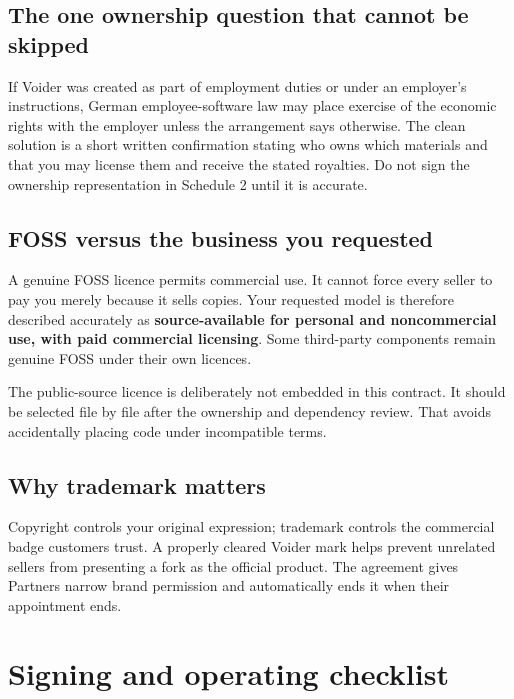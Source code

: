 \documentclass[11pt,a4paper]{article}
\begin{document}
\subsection*{The one ownership question that cannot be skipped}

If Voider was created as part of employment duties or under an employer's instructions, German employee-software law may place exercise of the economic rights with the employer unless the arrangement says otherwise. The clean solution is a short written confirmation stating who owns which materials and that you may license them and receive the stated royalties. Do not sign the ownership representation in Schedule 2 until it is accurate.

\subsection*{FOSS versus the business you requested}

A genuine FOSS licence permits commercial use. It cannot force every seller to pay you merely because it sells copies. Your requested model is therefore described accurately as \textbf{source-available for personal and noncommercial use, with paid commercial licensing}. Some third-party components remain genuine FOSS under their own licences.

The public-source licence is deliberately not embedded in this contract. It should be selected file by file after the ownership and dependency review. That avoids accidentally placing code under incompatible terms.

\subsection*{Why trademark matters}

Copyright controls your original expression; trademark controls the commercial badge customers trust. A properly cleared Voider mark helps prevent unrelated sellers from presenting a fork as the official product. The agreement gives Partners narrow brand permission and automatically ends it when their appointment ends.

\newpage
\section*{Signing and operating checklist}
\end{document}
